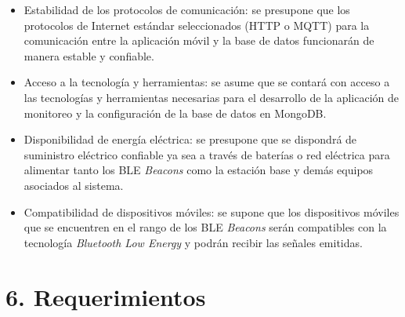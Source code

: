 \documentclass[
11pt, %
]{charter}
\begin{document}
\begin{itemize}
	\item Estabilidad de los protocolos de comunicación: se presupone que los protocolos de Internet estándar seleccionados (HTTP o MQTT) para la comunicación entre la aplicación móvil y la base de datos funcionarán de manera estable y confiable.
	\item Acceso a la tecnología y herramientas: se asume que se contará con acceso a las tecnologías y herramientas necesarias para el desarrollo de la aplicación de monitoreo y la configuración de la base de datos en MongoDB.
	\item Disponibilidad de energía eléctrica: se presupone que se dispondrá de suministro eléctrico confiable ya sea a través de baterías o red eléctrica para alimentar tanto los BLE \textit{Beacons} como la estación base y demás equipos asociados al sistema.
	\item Compatibilidad de dispositivos móviles: se supone que los dispositivos móviles que se encuentren en el rango de los BLE \textit{Beacons} serán compatibles con la tecnología \textit{Bluetooth Low Energy} y podrán recibir las señales emitidas. 
\end{itemize}

\section{6. Requerimientos}
\label{sec:requerimientos}
\end{document}
